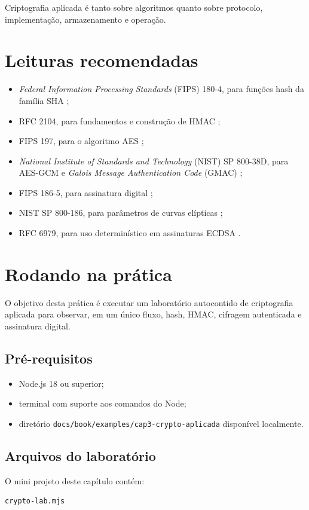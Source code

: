 Criptografia aplicada é tanto sobre algoritmos quanto sobre protocolo, implementação, armazenamento e operação.

\section{Leituras recomendadas}
\begin{itemize}[leftmargin=*]
  \item \textit{Federal Information Processing Standards} (FIPS) 180-4, para funções hash da família SHA \citep{fips180_4};
  \item RFC 2104, para fundamentos e construção de HMAC \citep{rfc2104};
  \item FIPS 197, para o algoritmo AES \citep{fips197};
  \item \textit{National Institute of Standards and Technology} (NIST) SP 800-38D, para AES-GCM e \textit{Galois Message Authentication Code} (GMAC) \citep{sp800_38d};
  \item FIPS 186-5, para assinatura digital \citep{fips186_5};
  \item NIST SP 800-186, para parâmetros de curvas elípticas \citep{sp800_186};
  \item RFC 6979, para uso determinístico em assinaturas ECDSA \citep{rfc6979}.
\end{itemize}

\section{Rodando na prática}
O objetivo desta prática é executar um laboratório autocontido de criptografia aplicada para observar, em um único fluxo, hash, HMAC, cifragem autenticada e assinatura digital.

\subsection{Pré-requisitos}
\begin{itemize}[leftmargin=*]
  \item Node.js 18 ou superior;
  \item terminal com suporte aos comandos do Node;
  \item diretório \texttt{docs/book/examples/cap3-crypto-aplicada} disponível localmente.
\end{itemize}

\subsection{Arquivos do laboratório}
O mini projeto deste capítulo contém:
\begin{verbatim}
crypto-lab.mjs
\end{verbatim}

